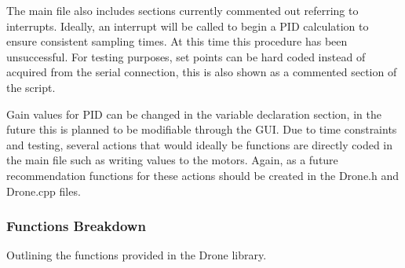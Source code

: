 The main file also includes sections currently commented out referring to interrupts. Ideally, an interrupt will be called to begin a PID calculation to ensure consistent sampling times. At this time this procedure has been unsuccessful. For testing purposes, set points can be hard coded instead of acquired from the serial connection, this is also shown as a commented section of the script.

Gain values for PID can be changed in the variable declaration section, in the future this is planned to be modifiable through the GUI. Due to time constraints and testing, several actions that would ideally be functions are directly coded in the main file such as writing values to the motors. Again, as a future recommendation functions for these actions should be created in the Drone.h and Drone.cpp files.

\subsubsection{Functions Breakdown}

Outlining the functions provided in the Drone library.

